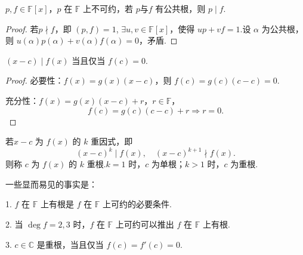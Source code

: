 \begin{proposition}
	\( p, f \in \mathbb{F}[x] \)，\( p \) 在 \(\mathbb{F}\) 上不可约，若 \( p \text{与} f \) 有公共根，则 \( p \mid f \).
	
\end{proposition}
\begin{proof}
	 若\( p \nmid f \)，即 \( (p, f) = 1 \), \( \exists u, v \in \mathbb{F}[x] \)，使得 \( up + vf = 1 \).设 \( \alpha \) 为公共根，则 \( u(\alpha) p(\alpha) + v(\alpha) f(\alpha) = 0 \)，矛盾.
\end{proof}
\begin{proposition}
	\( (x - c) \mid f(x) \) 当且仅当 \( f(c) = 0 \).
\end{proposition}
\begin{proof}
	必要性：\( f(x) = g(x)(x - c) \)，则 \( f(c) = g(c)(c - c) = 0 \).
	
	充分性：\( f(x) = g(x)(x - c) + r \)，\( r \in \mathbb{F} \)，
	\[ f(c) = g(c)(c - c) + r \Rightarrow r = 0. \]
	

\end{proof}
若\( x - c \) 为 \( f(x) \) 的 \( k \) 重因式，即
\[ (x - c)^k \mid f(x), \quad (x - c)^{k+1} \nmid f(x). \]
则称 \( c \) 为 \( f(x) \) 的 \( k \) 重根.\( k = 1 \) 时，\( c \) 为单根；\( k > 1 \) 时，\( c \) 为重根.

一些显而易见的事实是：

1. \( f \) 在 \(\mathbb{F}\) 上有根是 \( f \) 在 \(\mathbb{F}\) 上可约的必要条件.

2. 当 \( \deg f = 2, 3 \) 时，\( f \) 在 \(\mathbb{F}\) 上可约可以推出 \( f \) 在 \(\mathbb{F}\) 上有根.

3. \( c \in \mathbb{C} \) 是重根，当且仅当 \( f(c) = f'(c) = 0 \).

